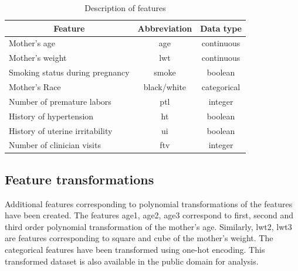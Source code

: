 \documentclass[a4paper,12pt]{article}
\begin{document}
\begin{table}[H]
\centering
\begin{tabular}{|l|c|c|}
\hline
\multicolumn{1}{|c|}{\textbf{Feature}}                 & \textbf{Abbreviation} & \textbf{Data type} \\ \hline
Mother’s age                                           & age                   & continuous         \\ \hline
Mother’s weight                                        & lwt                   & continuous         \\ \hline
Smoking status during pregnancy                        & smoke                 & boolean            \\ \hline
Mother's Race                                          & black/white           & categorical        \\ \hline
Number of premature labors                             & ptl                   & integer            \\ \hline
History of hypertension                                & ht                    & boolean            \\ \hline
History of uterine irritability                        & ui                    & boolean            \\ \hline
Number of clinician visits                             & ftv                   & integer            \\ \hline
\end{tabular}
\caption{Description of features}
\end{table}

\subsection{Feature transformations}
        Additional features corresponding to polynomial transformations of the features have been created. The features age1, age2, age3 correspond to first, second and third order polynomial transformation of the mother's age. Similarly, lwt2, lwt3 are features corresponding to square and cube of the mother's weight. The categorical features have been transformed using one-hot encoding. This transformed dataset is also available in the public domain for analysis.
        
\end{document}
